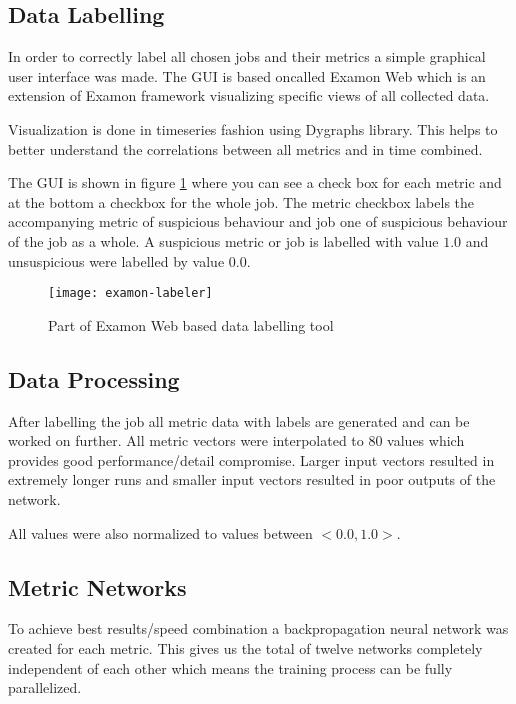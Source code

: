 \subsection{Data Labelling}
In order to correctly label all chosen jobs and their metrics a simple graphical user interface was made. The GUI is based oncalled Examon Web which is an extension of Examon framework visualizing specific views of all collected data.

Visualization is done in timeseries fashion using Dygraphs library. This helps to better understand the correlations between all metrics and in time combined.

The GUI is shown in figure \ref{fig:ex-labeler} where you can see a check box for each metric and at the bottom a checkbox for the whole job. The metric checkbox labels the accompanying metric of suspicious behaviour and job one of suspicious behaviour of the job as a whole. A suspicious metric or job is labelled with value $1.0$ and unsuspicious were labelled by value $0.0$.

\begin{figure}[ht]
    \centering
    \texttt{[image: examon-labeler]}
    \caption{Part of Examon Web based data labelling tool}
    \label{fig:ex-labeler}
\end{figure}

\subsection{Data Processing}

After labelling the job all metric data with labels are generated and can be worked on further. All metric vectors were interpolated to 80 values which provides good performance/detail compromise. Larger input vectors resulted in extremely longer runs and smaller input vectors resulted in poor outputs of the network.

All values were also normalized to values between $<0.0, 1.0>$.

\subsection{Metric Networks}

To achieve best results/speed combination a backpropagation neural network was created for each metric. This gives us the total of twelve networks completely independent of each other which means the training process can be fully parallelized.

